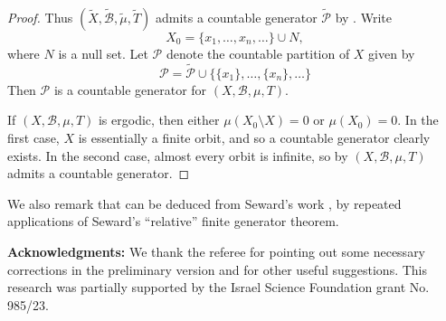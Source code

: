 \documentclass[12pt,reqno]{amsart}
\begin{document}
\begin{proof}
Thus $(\tilde X,\tilde{\mathcal{B}}, \tilde \mu, \tilde T)$
admits a countable generator $\tilde{\mathcal{P}}$ by . 
Write \[X_0 = \{ x_1,\ldots,x_n, \ldots\} \cup N,\] where $N$ is a null set.
Let $\mathcal{P}$ denote the countable partition of $X$ given by
\[ \mathcal{P} = \tilde{\mathcal{P}} \cup \{\{x_1\},\ldots,\{x_n\},\ldots\}\]
Then $\mathcal{P}$ is a countable generator for $(X,\mathcal{B},\mu,T)$.

If $(X,\mathcal{B},\mu,T)$ is ergodic, then either $\mu(X_0\setminus X)=0$ or $\mu(X_0)=0$. 
In the first case, $X$ is essentially a finite orbit, and so a countable generator clearly exists. In the second case, almost every orbit is infinite, so  by   $(X,
\mathcal{B},
\mu,T)$ admits a countable generator.
\end{proof}

We also remark that  can be deduced from Seward's  work  \cite{MR3904452}, by repeated applications of  Seward's ``relative''  finite generator theorem.

\noindent\textbf{Acknowledgments: } We thank the referee  for pointing out some necessary corrections in the preliminary version and for other useful suggestions. This
research was partially supported by the Israel Science Foundation grant No. 985/23.



\end{document}
